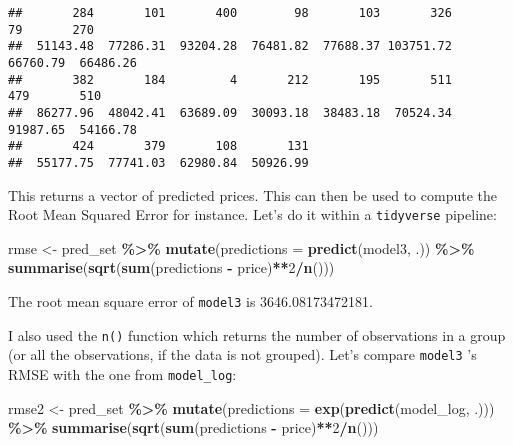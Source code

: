 \documentclass[
]{article}
\newenvironment{Shaded}{\begin{snugshade}}{\end{snugshade}}
\newcommand{\DataTypeTok}[1]{\textcolor[rgb]{0.13,0.29,0.53}{#1}}
\newcommand{\DecValTok}[1]{\textcolor[rgb]{0.00,0.00,0.81}{#1}}
\newcommand{\KeywordTok}[1]{\textcolor[rgb]{0.13,0.29,0.53}{\textbf{#1}}}
\newcommand{\NormalTok}[1]{#1}
\newcommand{\OperatorTok}[1]{\textcolor[rgb]{0.81,0.36,0.00}{\textbf{#1}}}
\newcommand{\StringTok}[1]{\textcolor[rgb]{0.31,0.60,0.02}{#1}}
\begin{document}
\begin{verbatim}
##       284       101       400        98       103       326        79       270 
##  51143.48  77286.31  93204.28  76481.82  77688.37 103751.72  66760.79  66486.26 
##       382       184         4       212       195       511       479       510 
##  86277.96  48042.41  63689.09  30093.18  38483.18  70524.34  91987.65  54166.78 
##       424       379       108       131 
##  55177.75  77741.03  62980.84  50926.99
\end{verbatim}

This returns a vector of predicted prices. This can then be used to compute the Root Mean Squared Error
for instance. Let's do it within a \texttt{tidyverse} pipeline:

\begin{Shaded}
\begin{Highlighting}[]
\NormalTok{rmse \textless{}{-}}\StringTok{ }\NormalTok{pred\_set }\OperatorTok{\%\textgreater{}\%}
\StringTok{  }\KeywordTok{mutate}\NormalTok{(}\DataTypeTok{predictions =} \KeywordTok{predict}\NormalTok{(model3, .)) }\OperatorTok{\%\textgreater{}\%}
\StringTok{  }\KeywordTok{summarise}\NormalTok{(}\KeywordTok{sqrt}\NormalTok{(}\KeywordTok{sum}\NormalTok{(predictions }\OperatorTok{{-}}\StringTok{ }\NormalTok{price)}\OperatorTok{**}\DecValTok{2}\OperatorTok{/}\KeywordTok{n}\NormalTok{()))}
\end{Highlighting}
\end{Shaded}

The root mean square error of \texttt{model3} is 3646.08173472181.

I also used the \texttt{n()} function which returns the number of observations in a group (or all the
observations, if the data is not grouped). Let's compare \texttt{model3} 's RMSE with the one from
\texttt{model\_log}:

\begin{Shaded}
\begin{Highlighting}[]
\NormalTok{rmse2 \textless{}{-}}\StringTok{ }\NormalTok{pred\_set }\OperatorTok{\%\textgreater{}\%}
\StringTok{  }\KeywordTok{mutate}\NormalTok{(}\DataTypeTok{predictions =} \KeywordTok{exp}\NormalTok{(}\KeywordTok{predict}\NormalTok{(model\_log, .))) }\OperatorTok{\%\textgreater{}\%}
\StringTok{  }\KeywordTok{summarise}\NormalTok{(}\KeywordTok{sqrt}\NormalTok{(}\KeywordTok{sum}\NormalTok{(predictions }\OperatorTok{{-}}\StringTok{ }\NormalTok{price)}\OperatorTok{**}\DecValTok{2}\OperatorTok{/}\KeywordTok{n}\NormalTok{()))}
\end{Highlighting}
\end{Shaded}
\end{document}
